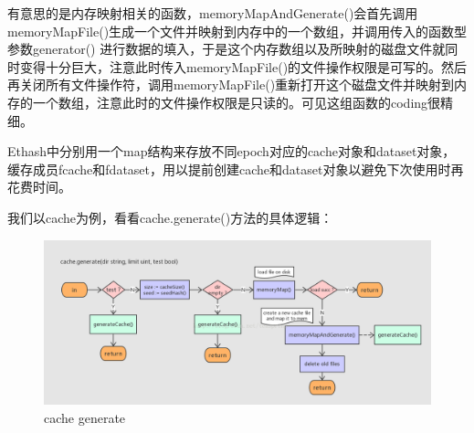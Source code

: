 \documentclass[UTF8]{ctexart}
\begin{document}
有意思的是内存映射相关的函数，memoryMapAndGenerate()会首先调用memoryMapFile()生成一个文件并映射到内存中的一个数组，并调用传入的函数型参数generator() 进行数据的填入，于是这个内存数组以及所映射的磁盘文件就同时变得十分巨大，注意此时传入memoryMapFile()的文件操作权限是可写的。然后再关闭所有文件操作符，调用memoryMapFile()重新打开这个磁盘文件并映射到内存的一个数组，注意此时的文件操作权限是只读的。可见这组函数的coding很精细。

Ethash中分别用一个map结构来存放不同epoch对应的cache对象和dataset对象，缓存成员fcache和fdataset，用以提前创建cache{}和dataset{}对象以避免下次使用时再花费时间。

我们以cache{}为例，看看cache.generate()方法的具体逻辑：

\begin{figure}
	\centering
	\includegraphics[scale=0.3]{cache_generate.png}
	\caption{cache generate}
	\label{cacheGenerate}
\end{figure}
\end{document}
